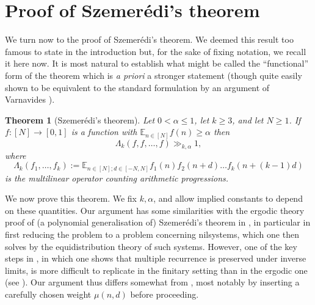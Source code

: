 \documentclass[11pt,reqno]{amsart}
\numberwithin{equation}{section}
\theoremstyle{plain}
\newtheorem{theorem}[subsection]{Theorem}
\theoremstyle{definition}
\renewcommand{\leq}{\leqslant}
\renewcommand{\geq}{\geqslant}
\newcommand\E{{\mathbb{E}}}
\newcommand\1{{\bf 1}}
\newcommand\2{{\bf 2}}
\begin{document}
\newcommand\vol{\operatorname{vol}}
\section{Proof of Szemer\'edi's theorem}\label{szem-sec}

We turn now to the proof of Szemer\'edi's theorem. We deemed this result too famous to state in the introduction but, for the sake of fixing notation, we recall it here now. It is most natural to establish what might be called the ``functional'' form of the theorem which is \emph{a priori} a stronger statement (though quite easily shown to be equivalent to the standard formulation by an argument of Varnavides \cite{var}).

\begin{theorem}[Szemer\'edi's theorem]\label{szthm}
Let $0 < \alpha \leq 1$, let $k \geq 3$, and let $N \geq 1$.   If $f : [N] \rightarrow [0,1]$ is a function with $\E_{n \in [N]} f(n) \geq \alpha$ then 
\[ \Lambda_k(f,f,\dots,f) \gg_{k,\alpha} 1,\] 
where
\[ \Lambda_k(f_1,\dots,f_k) := \E_{n \in [N]; d \in [-N,N]} f_1(n) f_2(n+d) \dots f_k(n + (k-1)d)\] is the multilinear operator counting arithmetic progressions.
\end{theorem}

We now prove this theorem.  We fix $k, \alpha$, and allow implied constants to depend on these quantities.  Our argument has some similarities with the ergodic theory proof of (a polynomial generalisation of) Szemer\'edi's theorem in \cite{leib2}, in particular in first reducing the problem to a problem concerning nilsystems, which one then solves by the equidistribution theory of such systems.  However, one of the key steps in \cite{leib2}, in which one shows that multiple recurrence is preserved under inverse limits, is more difficult to replicate in the finitary setting than in the ergodic one (see \cite{tao-quant-ergodic}).  Our argument thus differs somewhat from \cite{leib2}, most notably by inserting a carefully chosen weight $\mu(n,d)$ before proceeding.
\end{document}
